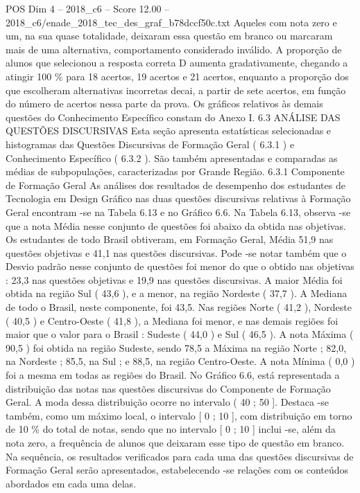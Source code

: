 \begin{textsample}{POS Dim 4 – 2018\_c6 – Score 12.00 – 2018\_c6/enade\_2018\_tec\_des\_graf\_b78dccf50c.txt}
Aqueles com nota zero e um, na sua quase totalidade, deixaram essa questão em branco ou marcaram mais de uma alternativa, comportamento considerado inválido.
A proporção de alunos que selecionou a resposta correta D aumenta gradativamente, chegando a atingir 100 \% para 18 acertos, 19 acertos e 21 acertos, enquanto a proporção dos que escolheram alternativas incorretas decai, a partir de sete acertos, em função do número de acertos nessa parte da prova.
Os gráficos relativos às demais questões do Conhecimento Específico constam do Anexo I. 6.3 ANÁLISE DAS QUESTÕES DISCURSIVAS Esta seção apresenta estatísticas selecionadas e histogramas das Questões Discursivas de Formação Geral ( 6.3.1 ) e Conhecimento Específico ( 6.3.2 ).
São também apresentadas e comparadas as médias de subpopulações, caracterizadas por Grande Região. 6.3.1 Componente de Formação Geral As análises dos resultados de desempenho dos estudantes de Tecnologia em Design Gráfico nas duas questões discursivas relativas à Formação Geral encontram -se na Tabela 6.13 e no Gráfico 6.6.
Na Tabela 6.13, observa -se que a nota Média nesse conjunto de questões foi abaixo da obtida nas objetivas.
Os estudantes de todo Brasil obtiveram, em Formação Geral, Média 51,9 nas questões objetivas e 41,1 nas questões discursivas.
Pode -se notar também que o Desvio padrão nesse conjunto de questões foi menor do que o obtido nas objetivas : 23,3 nas questões objetivas e 19,9 nas questões discursivas.
A maior Média foi obtida na região Sul ( 43,6 ), e a menor, na região Nordeste ( 37,7 ).
A Mediana de todo o Brasil, neste componente, foi 43,5.
Nas regiões Norte ( 41,2 ), Nordeste ( 40,5 ) e Centro-Oeste ( 41,8 ), a Mediana foi menor, e nas demais regiões foi maior que o valor para o Brasil : Sudeste ( 44,0 ) e Sul ( 46,5 ).
A nota Máxima ( 90,5 ) foi obtida na região Sudeste, sendo 78,5 a Máxima na região Norte ; 82,0, na Nordeste ; 85,5, na Sul ; e 88,5, na região Centro-Oeste.
A nota Mínima ( 0,0 ) foi a mesma em todas as regiões do Brasil.
No Gráfico 6.6, está representada a distribuição das notas nas questões discursivas do Componente de Formação Geral.
A moda dessa distribuição ocorre no intervalo ( 40 ; 50 ].
Destaca -se também, como um máximo local, o intervalo [ 0 ; 10 ], com distribuição em torno de 10 \% do total de notas, sendo que no intervalo [ 0 ; 10 ] inclui -se, além da nota zero, a frequência de alunos que deixaram esse tipo de questão em branco.
Na sequência, os resultados verificados para cada uma das questões discursivas de Formação Geral serão apresentados, estabelecendo -se relações com os conteúdos abordados em cada uma delas.

\end{textsample}
